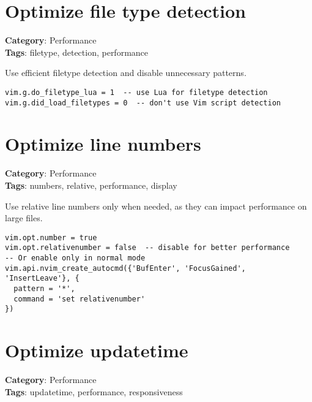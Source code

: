 {{{{{{{{{\section{Optimize file type detection}

\textbf{Category}: Performance\\ \textbf{Tags}: filetype, detection, performance
\vspace{0.5cm}

Use efficient filetype detection and disable unnecessary patterns.

\begin{Exa*}{}
\begin{Verbatim}[fontsize=\footnotesize, breaklines, breakanywhere]
vim.g.do_filetype_lua = 1  -- use Lua for filetype detection
vim.g.did_load_filetypes = 0  -- don't use Vim script detection
\end{Verbatim}
\end{Exa*}

\section{Optimize line numbers}

\textbf{Category}: Performance\\ \textbf{Tags}: numbers, relative, performance, display
\vspace{0.5cm}

Use relative line numbers only when needed, as they can impact performance on large files.

\begin{Exa*}{}
\begin{Verbatim}[fontsize=\footnotesize, breaklines, breakanywhere]
vim.opt.number = true
vim.opt.relativenumber = false  -- disable for better performance
-- Or enable only in normal mode
vim.api.nvim_create_autocmd({'BufEnter', 'FocusGained', 'InsertLeave'}, {
  pattern = '*',
  command = 'set relativenumber'
})
\end{Verbatim}
\end{Exa*}

\section{Optimize updatetime}

\textbf{Category}: Performance\\ \textbf{Tags}: updatetime, performance, responsiveness
\vspace{0.5cm}

}}}}}}}}}
